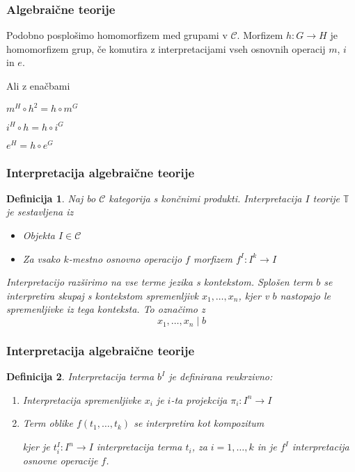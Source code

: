 \documentclass{beamer}
\newtheorem{definicija}{Definicija}
\begin{document}
\begin{frame}[fragile]
\frametitle{Algebraične teorije}
Podobno posplošimo homomorfizem med grupami v $\mathcal{C}$. Morfizem $h : G \to H$ je homomorfizem grup, če komutira z interpretacijami vseh osnovnih operacij $m$, $i$ in $e$.
\pause
\begin{center}
\end{center}
Ali z enačbami
\begin{description}
\item $m^H \circ h^2 = h \circ m^G$
\item $i^H \circ h = h \circ i^G$
\item $e^H = h \circ e^G$
\end{description}
\end{frame}

\begin{frame}[fragile]
\frametitle{Interpretacija algebraične teorije}
\begin{definicija}
Naj bo $\mathcal{C}$ kategorija s končnimi produkti. \emph{Interpretacija} $I$ teorije $\mathbb{T}$ je sestavljena iz
\begin{itemize}
\pause
\item Objekta $I \in \mathcal{C}$
\pause
\item Za vsako $k$-mestno osnovno operacijo $f$ morfizem $f^I : I^k \to I$
\end{itemize}
\pause
Interpretacijo razširimo na vse terme jezika s \emph{kontekstom}. Splošen term $b$ se interpretira skupaj s kontekstom spremenljivk $x_1, \ldots, x_n$, kjer v $b$ nastopajo le spremenljivke iz tega konteksta. To označimo z
$$x_1, \ldots, x_n \mid b$$
\end{definicija}
\end{frame}

\begin{frame}[fragile]
\frametitle{Interpretacija algebraične teorije}
\begin{definicija}
Interpretacija terma $b^I$ je definirana reukrzivno:
\begin{enumerate}
\item Interpretacija spremenljivke $x_i$ je $i$-ta projekcija $\pi_i : I^n \to I$
\pause
\item Term oblike $f(t_1, \ldots, t_k)$ se interpretira kot kompozitum 
\begin{center}
\end{center}
kjer je $t_i^I : I^n \to I$ interpretacija terma $t_i$, za $i = 1, \ldots, k$ in je $f^I$ interpretacija osnovne operacije $f$.
\end{enumerate}
\end{definicija}
\end{frame}
\end{document}
